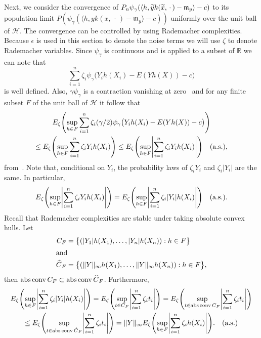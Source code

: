 \documentclass[AHL,Unicode,longabstracts,published]{cedram}
\theoremstyle{remark}
\DeclareMathOperator*{\absconv}
{abs\,conv}
\newcommand{\R}{\mathbb{R}}
\newcommand{\cH}{\mathcal{H}}
\newcommand{\mean}{\mathfrak{m}}
\let\oldtilde\tilde
\renewcommand*{\tilde}[1]{\mathchoice{\widetilde{#1}}{\widetilde{#1}}{\oldtilde{#1}}{\oldtilde{#1}}}
\let\oldhat\hat
\renewcommand*{\hat}[1]{\mathchoice{\widehat{#1}}{\widehat{#1}}{\oldhat{#1}}{\oldhat{#1}}}
\let\originalleft\left
\let\originalright\right
\renewcommand{\left}{\mathopen{}\mathclose\bgroup\originalleft}
\renewcommand{\right}{\aftergroup\egroup\originalright}
\begin{document}
Next, we consider the convergence of $P_n \psi_\gamma(\langle h, \tilde y k(\tilde x,\,\cdot\,) - \mean_{y} \rangle - c)$ to its population limit $P(\psi_\gamma(\langle h, y k(x,\,\cdot\,) - \mean_{y} \rangle - c))$ uniformly over the unit ball of $\cH$. The convergence can be controlled by using Rademacher complexities. Because $\epsilon$ is used in this section to denote the noise terms we will use $\zeta$ to denote Rademacher variables. Since $\psi_\gamma$ is continuous and is applied to a subset of $\R$ we can note that
\[
\sum_{i=1}^n \zeta_i \psi_\gamma\bigl(Y_i h(X_i) - E(Y h(X)) - c\bigr)
\]
is well defined. Also, $\gamma \psi_\gamma$ is a contraction vanishing at zero~\cite[Section~5.2.1]{GINE15} and for any finite subset $F$ of the unit ball of $\cH$ it follow that
\begin{multline*}
E_\zeta \left(
\sup_{h \in F} \sum_{i=1}^n \zeta_i (\gamma/2) \psi_\gamma\bigl(Y_i h(X_i) - E(Y h(X)) - c\bigr) \right) \\
\leq E_\zeta \left(
\sup_{h \in F} \sum_{i=1}^n \zeta_i Y_i h(X_i) \right) \leq E_\zeta \left(\sup_{h \in F} \left| \sum_{i=1}^n \zeta_i Y_i h(X_i) \right| \right) \text{\quad (a.s.)},
\end{multline*}
from~\cite[Theorem~5.2.1, Eq.~5.50]{GINE15}. Note that, conditional on $Y_i$, the probability laws of $\zeta_i Y_i$ and $\zeta_i |Y_i|$ are the same. In particular,
\[
E_\zeta \left(\sup_{h \in F} \left| \sum_{i=1}^n \zeta_i Y_i h(X_i) \right| \right) = E_\zeta \left(\sup_{h \in F} \left| \sum_{i=1}^n \zeta_i |Y_i| h(X_i) \right| \right) \text{\quad (a.s.)}.
\]
Recall that Rademacher complexities are stable under taking absolute convex hulls. Let
\begin{align*}
C_F &= \bigl\{ (|Y_1| h(X_1), \dots, |Y_n| h(X_n)) : h \in F\bigr\}\\
\intertext{and}
\hat C_F &= \bigl\{(\|Y\|_\infty h(X_1),\dots, \|Y\|_\infty h(X_n)) : h\in F\bigr\},
\end{align*}
then $\absconv C_F \subset \absconv \hat C_F$. Furthermore,
\begin{multline*}
E_\zeta \left(\sup_{h \in F} \left| \sum_{i=1}^n \zeta_i |Y_i| h(X_i) \right| \right) = E_\zeta \left(\sup_{t \in C_F} \left| \sum_{i=1}^n \zeta_i t_i \right| \right) = E_\zeta \left(\sup_{t \in \absconv C_F} \left| \sum_{i=1}^n \zeta_i t_i \right| \right)\\
\leq E_\zeta \left(\sup_{t \in \absconv \hat C_F} \left| \sum_{i=1}^n \zeta_i t_i \right| \right) = \|Y\|_\infty E_\zeta \left(\sup_{h \in F} \left| \sum_{i=1}^n \zeta_i h(X_i) \right| \right). \text{\quad (a.s.)}
\end{multline*}
\end{document}
